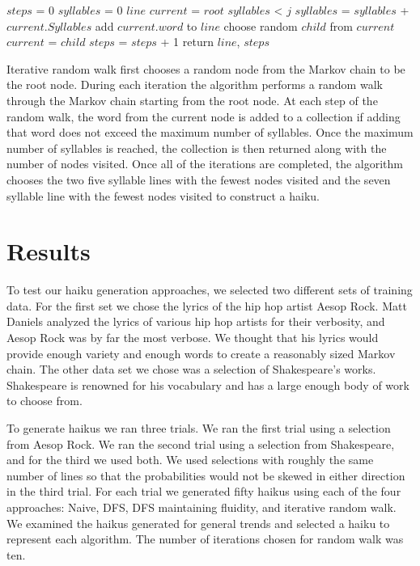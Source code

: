 \documentclass[]{article}
\begin{document}
\begin{algorithm}[H]
	\caption{$RandomWalk(root, j)$} \label{RandomWalk}
	\begin{algorithmic}[1]
		\State $steps$ = 0
		\State $syllables$ = 0
		\State $line$
		\State $current$ = $root$
		\While $syllables$ < $j$
				$syllables$ = $syllables$ + $current.Syllables$
				\State add $current.word$ to $line$
			\EndIf
			\State choose random $child$ from $current$
			$current$ = $child$
			$steps$ = $steps$ + 1
		\EndWhile
		\State return $line$, $steps$
	\end{algorithmic}
\end{algorithm}

Iterative random walk first chooses a random node from the Markov chain to be the root node. During each iteration the algorithm performs a random walk through the Markov chain starting from the root node. At each step of the random walk, the word from the current node is added to a collection if adding that word does not exceed the maximum number of syllables. Once the maximum number of syllables is reached, the collection is then returned along with the number of nodes visited. Once all of the iterations are completed, the algorithm chooses the two five syllable lines with the fewest nodes visited and the seven syllable line with the fewest nodes visited to construct a haiku. 

\section{Results}
To test our haiku generation approaches, we selected two different sets of training data. For the first set we chose the lyrics of the hip hop artist Aesop Rock. Matt Daniels analyzed the lyrics of various hip hop artists for their verbosity, and Aesop Rock was by far the most verbose\cite{Vocab}. We thought that his lyrics would provide enough variety and enough words to create a reasonably sized Markov chain. The other data set we chose was a selection of Shakespeare's works. Shakespeare is renowned for his vocabulary and has a large enough body of work to choose from.

To generate haikus we ran three trials. We ran the first trial using a selection from Aesop Rock. We ran the second trial using a selection from Shakespeare, and for the third we used both. We used selections with roughly the same number of lines so that the probabilities would not be skewed in either direction in the third trial. For each trial we generated fifty haikus using each of the four approaches: Naive, DFS, DFS maintaining fluidity, and iterative random walk. We examined the haikus generated for general trends and selected a haiku to represent each algorithm. The number of iterations chosen for random walk was ten.
\end{document}
